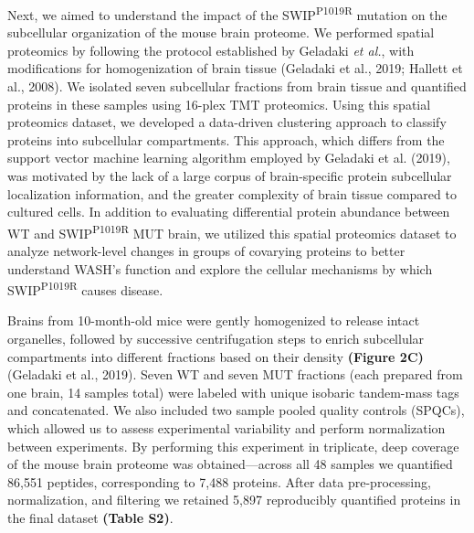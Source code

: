 Next, we aimed to understand the impact of the SWIP\textsuperscript{P1019R} mutation on the
subcellular organization of the mouse brain proteome. We performed spatial
proteomics by following the protocol established by Geladaki \textit{et al.}, with
modifications for homogenization of brain tissue (Geladaki et al., 2019; Hallett
et al., 2008). We isolated seven subcellular fractions from brain tissue and
quantified proteins in these samples using 16-plex TMT proteomics. Using this
spatial proteomics dataset, we developed a data-driven clustering approach to
classify proteins into subcellular compartments. This approach, which differs
from the support vector machine learning algorithm employed by Geladaki et al.
(2019), was motivated by the lack of a large corpus of brain-specific protein
subcellular localization information, and the greater complexity of brain tissue
compared to cultured cells. In addition to evaluating differential protein
abundance between WT and SWIP\textsuperscript{P1019R} MUT brain, we utilized this spatial
proteomics dataset to analyze network-level changes in groups of covarying
proteins to better understand WASH’s function and explore the cellular
mechanisms by which SWIP\textsuperscript{P1019R} causes disease. 

Brains from 10-month-old mice were gently homogenized to release intact
organelles, followed by successive centrifugation steps to enrich subcellular
compartments into different fractions based on their density \textbf{(Figure 2C)}
(Geladaki et al., 2019). Seven WT and seven MUT fractions (each prepared from
one brain, 14 samples total) were labeled with unique isobaric tandem-mass tags
and concatenated. We also included two sample pooled quality controls (SPQCs),
which allowed us to assess experimental variability and perform normalization
between experiments. By performing this experiment in triplicate, deep coverage
of the mouse brain proteome was obtained—across all 48 samples we quantified
86,551 peptides, corresponding to 7,488 proteins. After data pre-processing,
normalization, and filtering we retained 5,897 reproducibly quantified proteins
in the final dataset \textbf{(Table S2)}. 

